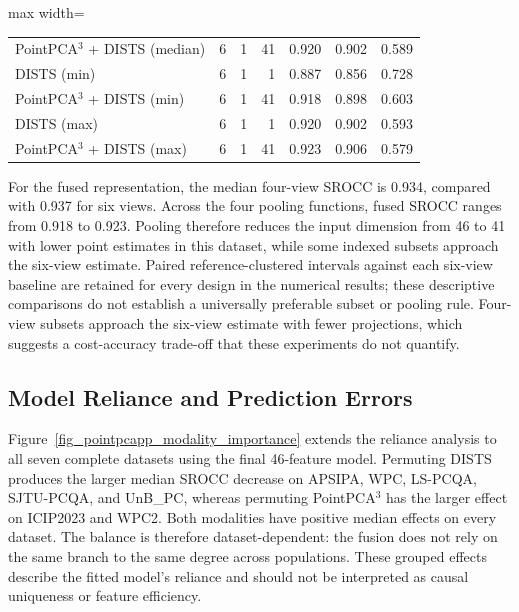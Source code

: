 \documentclass[final,3p,times,twocolumn]{elsarticle}
\begin{document}
\begin{table}[t!]
\begin{adjustbox}{max width=\textwidth}
\begin{tabular}{lrrrrrr}
        PointPCA$^3$ + DISTS (median) & 6 & 1 & 41 & 0.920 & 0.902 & 0.589 \\
        DISTS (min) & 6 & 1 & 1 & 0.887 & 0.856 & 0.728 \\
        PointPCA$^3$ + DISTS (min) & 6 & 1 & 41 & 0.918 & 0.898 & 0.603 \\
        DISTS (max) & 6 & 1 & 1 & 0.920 & 0.902 & 0.593 \\
        PointPCA$^3$ + DISTS (max) & 6 & 1 & 41 & 0.923 & 0.906 & 0.579 \\
        \bottomrule
        \end{tabular}
    \end{adjustbox}
\end{table}

For the fused representation, the median four-view SROCC is 0.934, compared with 0.937 for six views. Across the four pooling functions, fused SROCC ranges from 0.918 to 0.923. Pooling therefore reduces the input dimension from 46 to 41 with lower point estimates in this dataset, while some indexed subsets approach the six-view estimate. Paired reference-clustered intervals against each six-view baseline are retained for every design in the numerical results; these descriptive comparisons do not establish a universally preferable subset or pooling rule. Four-view subsets approach the six-view estimate with fewer projections, which suggests a cost-accuracy trade-off that these experiments do not quantify.


\subsection{Model Reliance and Prediction Errors} \label{sec_results_errors}

Figure~\ref{fig_pointpcapp_modality_importance} extends the reliance analysis to all seven complete datasets using the final 46-feature model. Permuting \gls{DISTS} produces the larger median \gls{SROCC} decrease on APSIPA, WPC, LS-PCQA, SJTU-PCQA, and UnB\_PC, whereas permuting PointPCA$^3$ has the larger effect on ICIP2023 and WPC2. Both modalities have positive median effects on every dataset. The balance is therefore dataset-dependent: the fusion does not rely on the same branch to the same degree across populations. These grouped effects describe the fitted model's reliance and should not be interpreted as causal uniqueness or feature efficiency.
\end{document}
